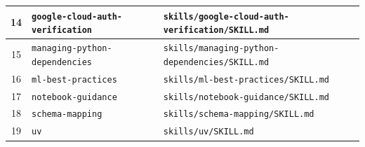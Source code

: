 \begin{longtable}{|c|p{}|p{}|}
14 & \texttt{google-cloud-auth-verification} & \texttt{skills/google-cloud-auth-verification/SKILL.md} \\ \hline
15 & \texttt{managing-python-dependencies} & \texttt{skills/managing-python-dependencies/SKILL.md} \\ \hline
16 & \texttt{ml-best-practices} & \texttt{skills/ml-best-practices/SKILL.md} \\ \hline
17 & \texttt{notebook-guidance} & \texttt{skills/notebook-guidance/SKILL.md} \\ \hline
18 & \texttt{schema-mapping} & \texttt{skills/schema-mapping/SKILL.md} \\ \hline
19 & \texttt{uv} & \texttt{skills/uv/SKILL.md} \\ \hline
\end{longtable}
\normalsize
